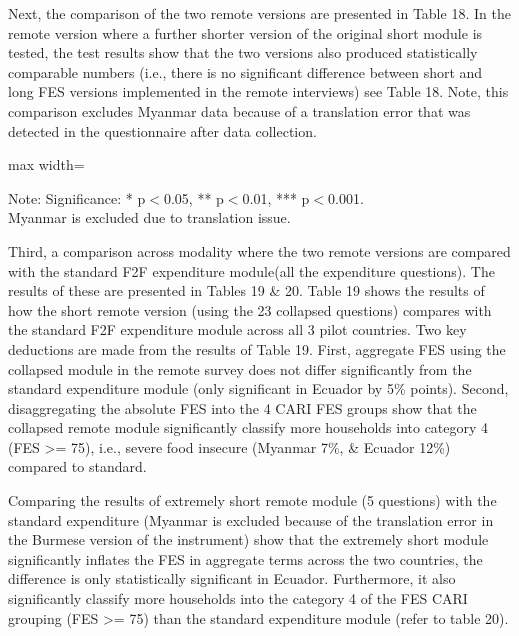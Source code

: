 \documentclass[11pt,harvard]{article}
\begin{document}
Next, the comparison of the two remote versions are presented in Table 18. In the remote version where a further shorter version of the original short module is tested, the test results show that the two versions also produced statistically comparable numbers (i.e., there is no significant difference between short and long FES versions implemented in the remote interviews) see Table 18. Note, this comparison excludes Myanmar data because of a translation error that was detected in the questionnaire after data collection.

\begin{table}[htbp]
	\centering
	\begin{adjustbox}{max width=\textwidth}
		\begin{threeparttable}
			\caption{Impact of Module Length on Expenditure and FES in Remote Surveys}
			\scriptsize
			 
			\label{tab:FES_RM_Form_Length_ECU_CAR}
			\begin{tablenotes}
				\item Note: Significance: * p$<$0.05, ** p$<$0.01, *** p$<$0.001. \\
						 Myanmar is excluded due to translation issue.
			\end{tablenotes}
		\end{threeparttable}
	\end{adjustbox}
\end{table}

Third, a comparison across modality where the two remote versions are compared with the standard F2F expenditure module(all the expenditure questions). The results of these are presented in Tables 19 \& 20. 
Table 19 shows the results of how the short remote version (using the 23 collapsed questions) compares with the standard F2F expenditure module across all 3 pilot countries. Two key deductions are made from the results of Table 19. First, aggregate FES using the collapsed module in the remote survey does not differ significantly from the standard expenditure module (only significant in Ecuador by 5\% points). Second, disaggregating the absolute FES into the 4 CARI FES groups show that the collapsed remote module significantly classify more households into category 4 (FES >= 75), i.e., severe food insecure (Myanmar 7\%, \& Ecuador 12\%) compared to standard. 


Comparing the results of extremely short remote module (5 questions) with the standard expenditure (Myanmar is excluded because of the translation error in the Burmese version of the instrument) show that the extremely short module significantly inflates the FES in aggregate terms across the two countries, the difference is only statistically significant in Ecuador. Furthermore, it also significantly classify more households into the category 4 of the FES CARI grouping (FES >= 75) than the standard expenditure module (refer to table 20).
\end{document}
